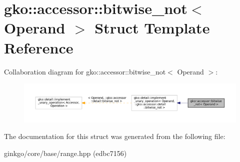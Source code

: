 \hypertarget{structgko_1_1accessor_1_1bitwise__not}{}\section{gko\+:\+:accessor\+:\+:bitwise\+\_\+not$<$ Operand $>$ Struct Template Reference}
\label{structgko_1_1accessor_1_1bitwise__not}


Collaboration diagram for gko\+:\+:accessor\+:\+:bitwise\+\_\+not$<$ Operand $>$\+:
\nopagebreak
\begin{figure}[H]
\begin{center}
\leavevmode
\includegraphics[width=350pt]{structgko_1_1accessor_1_1bitwise__not__coll__graph}
\end{center}
\end{figure}


The documentation for this struct was generated from the following file\+:\begin{DoxyCompactItemize}
\item 
ginkgo/core/base/range.\+hpp (edbc7156)\end{DoxyCompactItemize}
